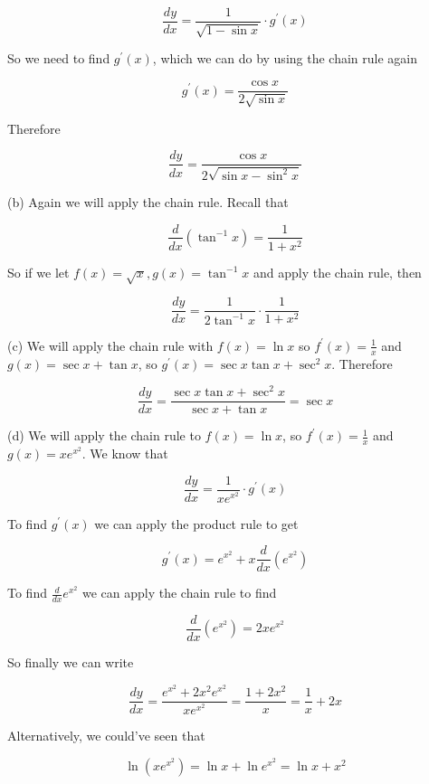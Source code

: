 \documentclass[10pt]{article}
\begin{document}
$$
\frac{d y}{d x}=\frac{1}{\sqrt{1-\sin x}} \cdot g^{\prime}(x)
$$

So we need to find $g^{\prime}(x)$, which we can do by using the chain rule again

$$
g^{\prime}(x)=\frac{\cos x}{2 \sqrt{\sin x}}
$$

Therefore

$$
\frac{d y}{d x}=\frac{\cos x}{2 \sqrt{\sin x-\sin ^{2} x}}
$$

(b) Again we will apply the chain rule. Recall that

$$
\frac{d}{d x}\left(\tan ^{-1} x\right)=\frac{1}{1+x^{2}}
$$

So if we let $f(x)=\sqrt{x}, g(x)=\tan ^{-1} x$ and apply the chain rule, then

$$
\frac{d y}{d x}=\frac{1}{2 \tan ^{-1} x} \cdot \frac{1}{1+x^{2}}
$$

(c) We will apply the chain rule with $f(x)=\ln x$ so $f^{\prime}(x)=\frac{1}{x}$ and $g(x)=\sec x+\tan x$, so $g^{\prime}(x)=\sec x \tan x+\sec ^{2} x$. Therefore

$$
\frac{d y}{d x}=\frac{\sec x \tan x+\sec ^{2} x}{\sec x+\tan x}=\sec x
$$

(d) We will apply the chain rule to $f(x)=\ln x$, so $f^{\prime}(x)=\frac{1}{x}$ and $g(x)=x e^{x^{2}}$. We know that

$$
\frac{d y}{d x}=\frac{1}{x e^{x^{2}}} \cdot g^{\prime}(x)
$$

To find $g^{\prime}(x)$ we can apply the product rule to get

$$
g^{\prime}(x)=e^{x^{2}}+x \frac{d}{d x}\left(e^{x^{2}}\right)
$$

To find $\frac{d}{d x} e^{x^{2}}$ we can apply the chain rule to find

$$
\frac{d}{d x}\left(e^{x^{2}}\right)=2 x e^{x^{2}}
$$

So finally we can write

$$
\frac{d y}{d x}=\frac{e^{x^{2}}+2 x^{2} e^{x^{2}}}{x e^{x^{2}}}=\frac{1+2 x^{2}}{x}=\frac{1}{x}+2 x
$$

Alternatively, we could've seen that

$$
\ln \left(x e^{x^{2}}\right)=\ln x+\ln e^{x^{2}}=\ln x+x^{2}
$$
\end{document}
